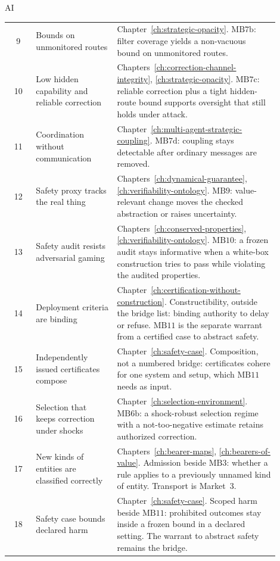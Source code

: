 \begin{authbar}{AI}
\begin{longtable}{@{}c L{0.30\linewidth} L{0.60\linewidth}@{}}
9 & Bounds on unmonitored routes & Chapter~\ref{ch:strategic-opacity}. \(\text{MB7b}\): filter coverage yields a non-vacuous bound on unmonitored routes. \\
10 & Low hidden capability and reliable correction & Chapters~\ref{ch:correction-channel-integrity}, \ref{ch:strategic-opacity}. \(\text{MB7c}\): reliable correction plus a tight hidden-route bound supports oversight that still holds under attack. \\
11 & Coordination without communication & Chapter~\ref{ch:multi-agent-strategic-coupling}. \(\text{MB7d}\): coupling stays detectable after ordinary messages are removed. \\
12 & Safety proxy tracks the real thing & Chapters~\ref{ch:dynamical-guarantee}, \ref{ch:verifiability-ontology}. \(\text{MB9}\): value-relevant change moves the checked abstraction or raises uncertainty. \\
13 & Safety audit resists adversarial gaming & Chapters~\ref{ch:conserved-properties}, \ref{ch:verifiability-ontology}. \(\text{MB10}\): a frozen audit stays informative when a white-box construction tries to pass while violating the audited properties. \\
14 & Deployment criteria are binding & Chapter~\ref{ch:certification-without-construction}. Constructibility, outside the bridge list: binding authority to delay or refuse. \(\text{MB11}\) is the separate warrant from a certified case to abstract safety. \\
15 & Independently issued certificates compose & Chapter~\ref{ch:safety-case}. Composition, not a numbered bridge: certificates cohere for one system and setup, which \(\text{MB11}\) needs as input. \\
16 & Selection that keeps correction under shocks & Chapter~\ref{ch:selection-environment}. \(\text{MB6b}\): a shock-robust selection regime with a not-too-negative estimate retains authorized correction. \\
17 & New kinds of entities are classified correctly & Chapters~\ref{ch:bearer-maps}, \ref{ch:bearers-of-value}. Admission beside \(\text{MB3}\): whether a rule applies to a previously unnamed kind of entity. Transport is Market~3. \\
18 & Safety case bounds declared harm & Chapter~\ref{ch:safety-case}. Scoped harm beside \(\text{MB11}\): prohibited outcomes stay inside a frozen bound in a declared setting. The warrant to abstract safety remains the bridge. \\
\end{longtable}


\end{authbar}
